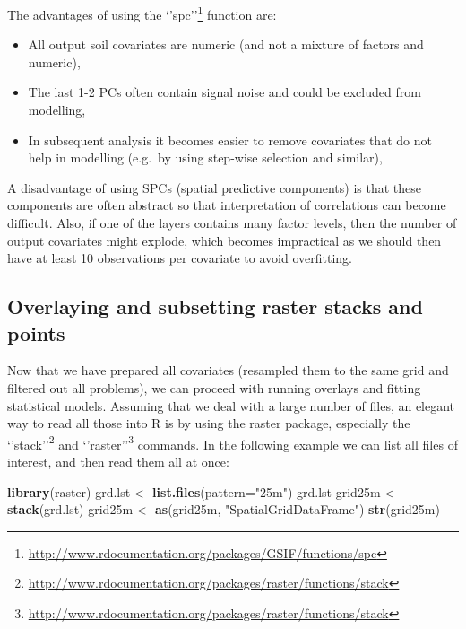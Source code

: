 \documentclass[11pt]{krantz}
\newenvironment{Shaded}{\begin{snugshade}}{\end{snugshade}}
\newcommand{\DataTypeTok}[1]{\textcolor[rgb]{0.27,0.27,0.27}{#1}}
\newcommand{\KeywordTok}[1]{\textcolor[rgb]{0.27,0.27,0.27}{\textbf{#1}}}
\newcommand{\NormalTok}[1]{#1}
\newcommand{\StringTok}[1]{\textcolor[rgb]{0.5,0.5,0.5}{#1}}
\renewcommand{\href}[2]{#2\footnote{\url{#1}}}
\theoremstyle{definition}
\theoremstyle{definition}
\theoremstyle{definition}
\theoremstyle{remark}
\begin{document}
The advantages of using the
\href{http://www.rdocumentation.org/packages/GSIF/functions/spc}{`'spc''}
function are:

\begin{itemize}
\item
  All output soil covariates are numeric (and not a mixture of factors
  and numeric),
\item
  The last 1-2 PCs often contain signal noise and could be excluded from
  modelling,
\item
  In subsequent analysis it becomes easier to remove covariates that do
  not help in modelling (e.g.~by using step-wise selection and similar),
\end{itemize}

A disadvantage of using SPCs (spatial predictive components) is that
these components are often abstract so that interpretation of
correlations can become difficult. Also, if one of the layers contains
many factor levels, then the number of output covariates might explode,
which becomes impractical as we should then have at least 10
observations per covariate to avoid overfitting.

\hypertarget{overlaying-and-subsetting-raster-stacks-and-points}{%
\subsection{Overlaying and subsetting raster stacks and
points}\label{overlaying-and-subsetting-raster-stacks-and-points}}

Now that we have prepared all covariates (resampled them to the same
grid and filtered out all problems), we can proceed with running
overlays and fitting statistical models. Assuming that we deal with a
large number of files, an elegant way to read all those into R is by
using the raster package, especially the
\href{http://www.rdocumentation.org/packages/raster/functions/stack}{`'stack''}
and
\href{http://www.rdocumentation.org/packages/raster/functions/stack}{`'raster''}
commands. In the following example we can list all files of interest,
and then read them all at once:

\begin{Shaded}
\begin{Highlighting}[]
\KeywordTok{library}\NormalTok{(raster)}
\NormalTok{grd.lst <-}\StringTok{ }\KeywordTok{list.files}\NormalTok{(}\DataTypeTok{pattern=}\StringTok{"25m"}\NormalTok{)}
\NormalTok{grd.lst}
\NormalTok{grid25m <-}\StringTok{ }\KeywordTok{stack}\NormalTok{(grd.lst)}
\NormalTok{grid25m <-}\StringTok{ }\KeywordTok{as}\NormalTok{(grid25m, }\StringTok{"SpatialGridDataFrame"}\NormalTok{)}
\KeywordTok{str}\NormalTok{(grid25m)}
\end{Highlighting}
\end{Shaded}
\end{document}
